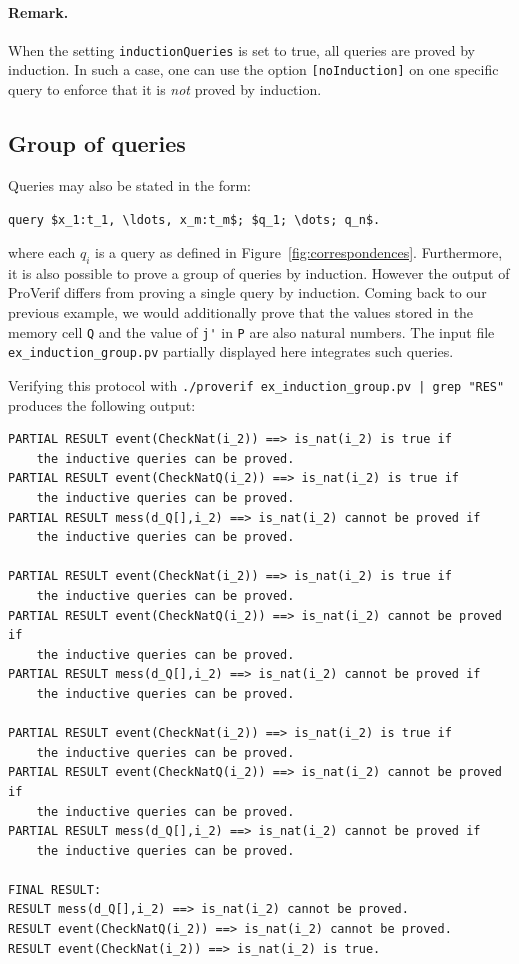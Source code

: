 \documentclass{book}
\begin{document}
\paragraph{Remark.} When the setting \lstinline!inductionQueries! is set to true, all queries are proved by induction. In such a case, one can use the option \lstinline![noInduction]! on one specific query to enforce that it is \emph{not} proved by induction.

\subsection{Group of queries}

Queries may also be stated in the form:
%
\begin{lstlisting}[numbers=none]
	query $x_1:t_1, \ldots, x_m:t_m$; $q_1; \dots; q_n$.
\end{lstlisting}
%
where each $q_i$ is a query as defined in Figure~\ref{fig:correspondences}.
Furthermore, it is also possible to prove a group of queries by induction. However the output of ProVerif differs from proving a single query by induction. Coming back to our previous example, we would additionally prove that the values stored in the memory cell \lstinline!Q! and the value of \lstinline!j'! in \lstinline!P! are also natural numbers. The input file \texttt{{\docexdir}ex\_induction\_group.pv} partially displayed here integrates such queries.



Verifying this protocol with \texttt{./proverif {\docexdir}ex\_induction\_group.pv | grep "RES"} produces the following output:
\begin{lstlisting}[numbers=none]
PARTIAL RESULT event(CheckNat(i_2)) ==> is_nat(i_2) is true if
	the inductive queries can be proved.
PARTIAL RESULT event(CheckNatQ(i_2)) ==> is_nat(i_2) is true if
	the inductive queries can be proved.
PARTIAL RESULT mess(d_Q[],i_2) ==> is_nat(i_2) cannot be proved if
	the inductive queries can be proved.

PARTIAL RESULT event(CheckNat(i_2)) ==> is_nat(i_2) is true if
	the inductive queries can be proved.
PARTIAL RESULT event(CheckNatQ(i_2)) ==> is_nat(i_2) cannot be proved if
	the inductive queries can be proved.
PARTIAL RESULT mess(d_Q[],i_2) ==> is_nat(i_2) cannot be proved if
	the inductive queries can be proved.

PARTIAL RESULT event(CheckNat(i_2)) ==> is_nat(i_2) is true if
	the inductive queries can be proved.
PARTIAL RESULT event(CheckNatQ(i_2)) ==> is_nat(i_2) cannot be proved if
	the inductive queries can be proved.
PARTIAL RESULT mess(d_Q[],i_2) ==> is_nat(i_2) cannot be proved if
	the inductive queries can be proved.

FINAL RESULT:
RESULT mess(d_Q[],i_2) ==> is_nat(i_2) cannot be proved.
RESULT event(CheckNatQ(i_2)) ==> is_nat(i_2) cannot be proved.
RESULT event(CheckNat(i_2)) ==> is_nat(i_2) is true.
\end{lstlisting}
\end{document}
